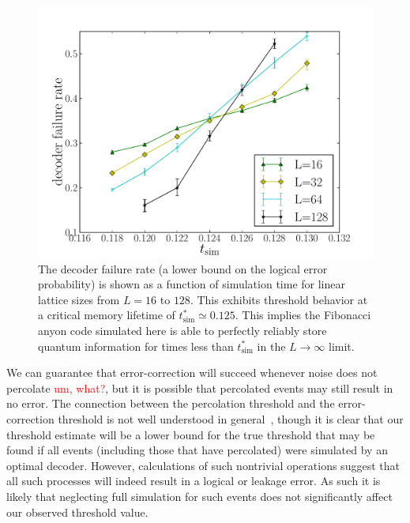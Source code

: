 \documentclass[aps, prl, letterpaper, twocolumn, superscriptaddress, notitlepage, 10pt]{revtex4}
\newcommand{\dude}[1]{\textcolor{red}{#1}}
\begin{document}
\begin{figure}[t!]
\begin{center}
	\includegraphics[width=\columnwidth]{anyons-kyle.pdf}
\caption{The decoder failure rate (a lower bound on the logical error probability) is shown as a function of simulation time for linear lattice sizes from $L=16$ to $128$. 
This exhibits threshold behavior at a critical memory lifetime of $t_{\mathrm{sim}}^*\simeq 0.125$. 
This implies the Fibonacci anyon code simulated here is able to perfectly reliably store quantum information for times less than $t_{\mathrm{sim}}^*$ in the $L\to \infty$ limit.}
\label{f:threshold}
\end{center}
\vspace{-10pt}
\end{figure}

We can guarantee that error-correction will succeed whenever noise does 
not percolate \dude{um, what?}, 
but it is possible that percolated events may still result in no error. 
The connection between the percolation threshold and the error-correction threshold 
is not well understood in general~\cite{Hastings2014}, though it is clear 
that our threshold estimate will be a lower bound for 
the true threshold that may be found if all events 
(including those that have percolated) were simulated by an optimal decoder. 
However, calculations of such nontrivial operations suggest that all such 
processes will indeed result in a logical or leakage error.
As such it is likely that neglecting full simulation for 
such events does not significantly affect our observed threshold value.
\end{document}
